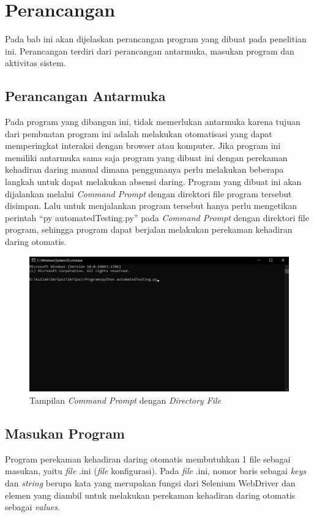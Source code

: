 \chapter{Perancangan}
\label{chap:perancangan}
Pada bab ini akan dijelaskan perancangan program yang dibuat pada penelitian ini. Perancangan terdiri dari perancangan antarmuka, masukan program dan aktivitas sistem. 

\section{Perancangan Antarmuka}
Pada program yang dibangun ini, tidak memerlukan antarmuka karena tujuan dari pembuatan program ini adalah melakukan otomatisasi yang dapat memperingkat interaksi dengan browser atau komputer. Jika program ini memiliki antarmuka sama saja program yang dibuat ini dengan perekaman kehadiran daring manual dimana penggunanya perlu melakukan beberapa langkah untuk dapat melakukan absensi daring. Program yang dibuat ini akan dijalankan melalui \textit{Command Prompt} dengan direktori file program tersebut disimpan. Lalu untuk menjalankan program tersebut hanya perlu mengetikan perintah ``py automatedTesting.py'' pada \textit{Command Prompt} dengan direktori file program, sehingga program dapat berjalan melakukan perekaman kehadiran daring otomatis.
\begin{figure}[H]
	\centering
	\includegraphics[scale=0.5]{Gambar/cmd.jpg}
	\caption{Tampilan \textit{Command Prompt} dengan \textit{Directory File}} 
	\label{fig:cmd}
\end{figure}

\section{Masukan Program}
\label{sec:inputConfig} 
Program perekaman kehadiran daring otomatis membutuhkan 1 file sebagai masukan, yaitu \textit{file} .ini (\textit{file} konfigurasi). Pada \textit{file} .ini, nomor baris sebagai \textit{keys} dan \textit{string} berupa kata yang merupakan fungsi dari Selenium WebDriver dan elemen yang diambil untuk melakukan perekaman kehadiran daring otomatis sebagai \textit{values}. 

